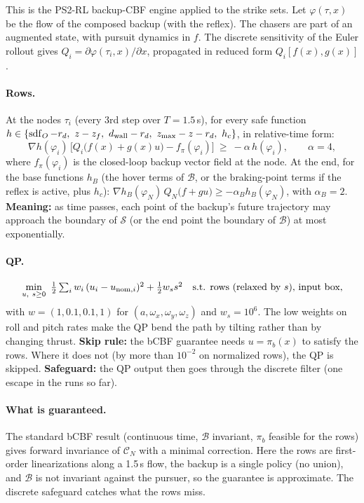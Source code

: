 \documentclass[11pt]{article}
\newcommand{\sdf}{\operatorname{sdf}}
\newcommand{\Safe}{\mathcal{S}}
\newcommand{\Base}{\mathcal{B}}
\newcommand{\CN}{\mathcal{C}_N}
\begin{document}
This is the PS2-RL backup-CBF engine applied to the strike sets.
Let $\varphi(\tau,x)$ be the flow of the composed backup (with the reflex). The chasers are part of an augmented state, with pursuit dynamics in $f$.
The discrete sensitivity of the Euler rollout gives $Q_i=\partial\varphi(\tau_i,x)/\partial x$, propagated in reduced form $Q_i[f(x),g(x)]$.

\paragraph{Rows.} At the nodes $\tau_i$ (every 3rd step over $T=1.5$\,s), for every safe function $h\in\{\sdf_O-r_d,\ z-z_f,\ d_{\rm wall}-r_d,\ z_{\max}-z-r_d,\ h_c\}$, in relative-time form:
\begin{equation}
\nabla h(\varphi_i)\,\big[Q_i\big(f(x)+g(x)u\big)-f_\pi(\varphi_i)\big]\ \ge\ -\alpha\,h(\varphi_i),\qquad \alpha=4,
\end{equation}
where $f_\pi(\varphi_i)$ is the closed-loop backup vector field at the node.
At the end, for the base functions $h_B$ (the hover terms of $\Base$, or the braking-point terms if the reflex is active, plus $h_c$):
$\nabla h_B(\varphi_N)\,Q_N\big(f+gu\big)\ge-\alpha_B h_B(\varphi_N)$, with $\alpha_B=2$.
\textbf{Meaning:} as time passes, each point of the backup's future trajectory may approach the boundary of $\Safe$ (or the end point the boundary of $\Base$) at most exponentially.

\paragraph{QP.}
\begin{equation}
\min_{u,\ s\ge0}\ \tfrac12\textstyle\sum_i w_i\,(u_i-u_{{\rm nom},i})^2+\tfrac12 w_s s^2
\quad\text{s.t. rows (relaxed by $s$), input box,}
\end{equation}
with $w=(1,0.1,0.1,1)$ for $(a,\omega_x,\omega_y,\omega_z)$ and $w_s=10^6$.
The low weights on roll and pitch rates make the QP bend the path by tilting rather than by changing thrust.
\textbf{Skip rule:} the bCBF guarantee needs $u=\pi_b(x)$ to satisfy the rows. Where it does not (by more than $10^{-2}$ on normalized rows), the QP is skipped.
\textbf{Safeguard:} the QP output then goes through the discrete filter (one escape in the runs so far).

\paragraph{What is guaranteed.} The standard bCBF result (continuous time, $\Base$ invariant, $\pi_b$ feasible for the rows) gives forward invariance of $\CN$ with a minimal correction.
Here the rows are first-order linearizations along a 1.5\,s flow, the backup is a single policy (no union), and $\Base$ is not invariant against the pursuer, so the guarantee is approximate. The discrete safeguard catches what the rows miss.
\end{document}

